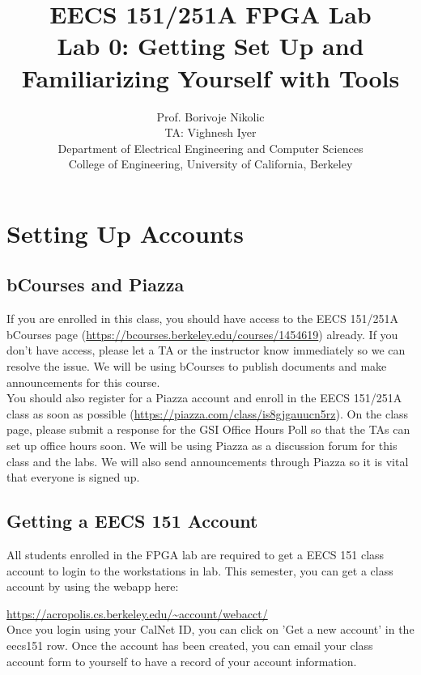 \documentclass[11pt]{article}
\begin{document}
\title{EECS 151/251A FPGA Lab\\
Lab 0: Getting Set Up and Familiarizing Yourself with Tools}

\author{Prof. Borivoje Nikolic \\
TA: Vighnesh Iyer \\Department of Electrical Engineering and Computer Sciences\\
College of Engineering, University of California, Berkeley}
\date{}
\maketitle

\section{Setting Up Accounts}

\subsection{bCourses and Piazza}
If you are enrolled in this class, you should have access to the EECS 151/251A bCourses page (\url{https://bcourses.berkeley.edu/courses/1454619}) already. If you don't have access, please let a TA or the instructor know immediately so we can resolve the issue. We will be using bCourses to publish documents and make announcements for this course.\\

You should also register for a Piazza account and enroll in the EECS 151/251A class as soon as possible (\url{https://piazza.com/class/is8gjgauucn5rz}). On the class page, please submit a response for the GSI Office Hours Poll so that the TAs can set up office hours soon. We will be using Piazza as a discussion forum for this class and the labs. We will also send announcements through Piazza so it is vital that everyone is signed up.

\subsection{Getting a EECS 151 Account}
All students enrolled in the FPGA lab are required to get a EECS 151 class account to login to the workstations in lab. This semester, you can get a class account by using the webapp here:

\url{https://acropolis.cs.berkeley.edu/~account/webacct/} \\

Once you login using your CalNet ID, you can click on 'Get a new account' in the eecs151 row. Once the account has been created, you can email your class account form to yourself to have a record of your account information. \\
\end{document}

